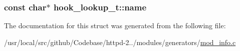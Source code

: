 \subsubsection[{\texorpdfstring{name}{name}}]{\setlength{\rightskip}{0pt plus 5cm}const char$\ast$ hook\+\_\+lookup\+\_\+t\+::name}\hypertarget{structhook__lookup__t_aa4ff74aeb92740bdc7479838f06143d9}{}\label{structhook__lookup__t_aa4ff74aeb92740bdc7479838f06143d9}


The documentation for this struct was generated from the following file\+:\begin{DoxyCompactItemize}
\item 
/usr/local/src/github/\+Codebase/httpd-\/2../modules/generators/\hyperlink{mod__info_8c}{mod\+\_\+info.\+c}\end{DoxyCompactItemize}
